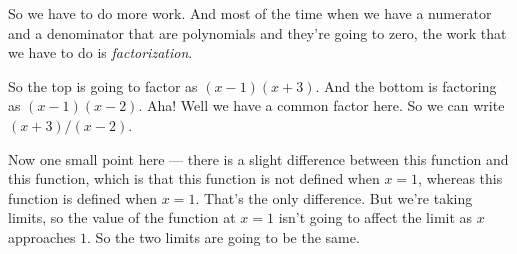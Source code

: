 \documentclass[pdftex, brazil, 12pt, twoside]{article}
\begin{document}
So we have to do more work.
And most of the time when we have
a numerator and a denominator that are polynomials
and they're going to zero, the work that we have to do
is \emph{factorization}.

So the top is going to factor as $(x - 1)(x + 3)$.
And the bottom is factoring as $(x - 1)(x - 2)$.
Aha!
Well we have a common factor here.
So we can write $(x + 3)/(x - 2)$.

\begin{figure}[H]
  \begin{center}
  \end{center}
\end{figure}

Now one small point here --- there is a slight difference
between this function and this function,
which is that this function is not
defined when $x = 1$, whereas this function is defined
when $x = 1$.
That's the only difference.
But we're taking limits, so the value
of the function at $x = 1$ isn't
going to affect the limit as $x$ approaches $1$.
So the two limits are going to be the same.

\begin{figure}[H]
  \begin{center}
  \end{center}
\end{figure}
\end{document}
